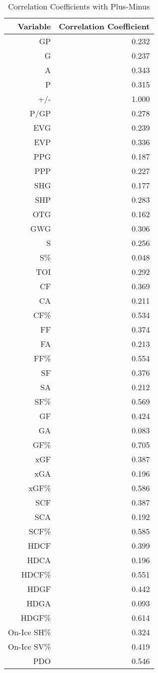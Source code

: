 \documentclass[12pt]{article}
\begin{document}
\begin{table}[tbp]
  \caption{Correlation Coefficients with Plus-Minus}
  \label{tab:rv1}
\centering
\small
\begin{tabular}{rr}
  \toprule
Variable & Correlation Coefficient \\ 
  \midrule
  GP & 0.232 \\ 
  G & 0.237 \\ 
  A & 0.343 \\ 
  P & 0.315 \\ 
  +/- & 1.000 \\ 
  P/GP & 0.278 \\ 
  EVG & 0.239 \\ 
  EVP & 0.336 \\ 
  PPG & 0.187 \\ 
  PPP & 0.227 \\ 
  SHG & 0.177 \\ 
  SHP & 0.283 \\ 
  OTG & 0.162 \\ 
  GWG & 0.306 \\ 
  S & 0.256 \\ 
  S\% & 0.048 \\ 
  TOI & 0.292 \\ 
  CF & 0.369 \\ 
  CA & 0.211 \\ 
  CF\% & 0.534 \\ 
  FF & 0.374 \\ 
  FA & 0.213 \\ 
  FF\% & 0.554 \\ 
  SF & 0.376 \\ 
  SA & 0.212 \\ 
  SF\% & 0.569 \\ 
  GF & 0.424 \\ 
  GA & 0.083 \\ 
  GF\% & 0.705 \\ 
  xGF & 0.387 \\ 
  xGA & 0.196 \\ 
  xGF\% & 0.586 \\ 
  SCF & 0.387 \\ 
  SCA & 0.192 \\ 
  SCF\% & 0.585 \\ 
  HDCF & 0.399 \\ 
  HDCA & 0.196 \\ 
  HDCF\% & 0.551 \\ 
  HDGF & 0.442 \\ 
  HDGA & 0.093 \\ 
  HDGF\% & 0.614 \\ 
  On-Ice SH\% & 0.324 \\ 
  On-Ice SV\% & 0.419 \\ 
  PDO & 0.546 \\ 
  \bottomrule
\end{tabular}
\end{table}
\end{document}
